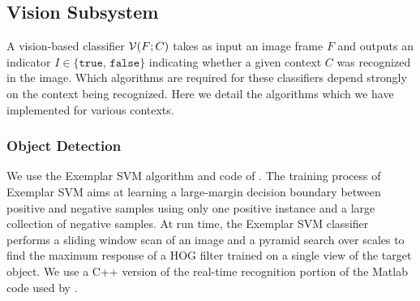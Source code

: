 \documentclass{llncs}
\begin{document}

\subsection{Vision Subsystem}
A vision-based classifier ${\cal V}(F;C)$ takes as input an image
frame $F$ and outputs an indicator $I\in\{\texttt{true, false}\}$
indicating whether a given context $C$ was recognized in the
image. Which algorithms are required for these classifiers depend
strongly on the context being recognized.  Here we detail the
algorithms which we have implemented for various contexts.

\subsubsection{Object Detection}
We use the Exemplar SVM algorithm and code of \citet{exemplarsvm}.  The training
process of Exemplar SVM aims at learning a large-margin decision
boundary between positive and negative samples using only one positive
instance and a large collection of negative samples. At run time, the
Exemplar SVM classifier performs a sliding window scan of an image and
a pyramid search over scales to find the maximum response of a HOG
filter trained on a single view of the target object. We use a C++ version of the real-time recognition portion of the Matlab code
used by \citet{exemplarsvm}.
\end{document}
